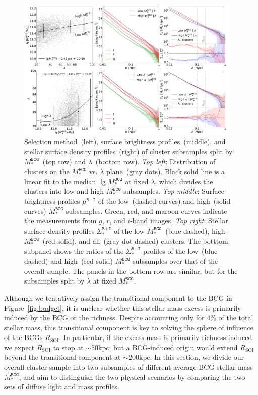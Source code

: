 \documentclass[fleqn,usenatbib]{mnras}
\newcommand{\rsoi}{R_{\mathrm{SOI}}}
\newcommand{\sigbi}{\Sigma_*^{\texttt{B+I}}}
\newcommand{\mubi}{\mu^{\texttt{B+I}}}
\newcommand{\msbcg}{M_*^{\texttt{BCG}}}
\newcommand{\kpc}{\mathrm{kpc}}
\newcommand\xkchen[1]{{\color{cyan} {#1}}}
\begin{document}
\begin{figure}
    \centering\includegraphics[width=0.96\textwidth]{fig/gri_subsample_result.pdf}
    \caption{Selection method~(left), surface brightness profiles~(middle),
    and stellar surface density profiles~(right) of cluster subsamples
    split by $\msbcg$~(top row) and $\lambda$~(bottom row).
	{\it Top left}: Distribution of clusters on the $\msbcg$ vs.
    $\lambda$ plane~(gray dots).  Black solid line is a linear fit to the
    median $\lg\msbcg$ at fixed $\lambda$, which divides the clusters into
    low and high-$\msbcg$ subsamples.  {\it Top middle}: Surface brightness
    profiles $\mubi$ of the low~(dashed curves) and high~(solid curves)
    $\msbcg$ subsamples. Green, red, and maroon curves indicate the
    measurements from $g$, $r$, and $i$-band images.  {\it Top right}:
    Stellar surface density profiles $\sigbi$ of the low-$\msbcg$~(blue
    dashed), high-$\msbcg$~(red solid), and all~(gray dot-dashed) clusters.
    The botttom subpanel shows the ratios of the $\sigbi$ profiles of the
    low~(blue dashed) and high~(red solid) $\msbcg$ subsamples over that of
    the overall sample. The panels in the bottom row are similar, but for
    the subsamples split by $\lambda$ at fixed $\msbcg$.\label{fig:split}}
\end{figure}


Although we tentatively assign the transitional component to the BCG in
Figure~\ref{fig:budget}, it is unclear whether this stellar mass excess is
primarily induced by the BCG or the richness. Despite accounting
only for \xkchen{$4\%$} of the total stellar mass, this transitional component is
key to solving the sphere of influence of the BCGs $\rsoi$.  In particular,
if the excess mass is primarily richness-induced, we expect $\rsoi$ to stop
at ${\sim}50\kpc$; but a BCG-induced origin would extend $\rsoi$ beyond the
transitional component at ${\sim}200\kpc$. In this section, we divide our
overall cluster sample into two subsamples of different average BCG stellar
mass $\msbcg$, and aim to distinguish the two physical scenarios by
comparing the two sets of diffuse light and mass profiles.
\end{document}
